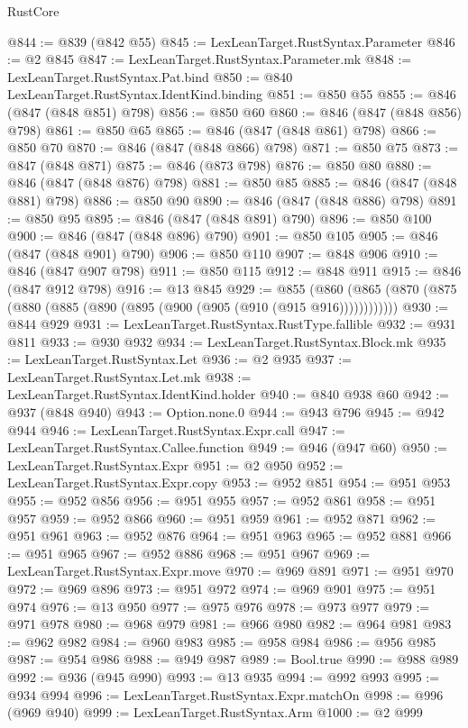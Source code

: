 \begin{lexlean}{RustCore}
\begin{coremodule}
@844 := @839 (@842 @55)
@845 := LexLeanTarget.RustSyntax.Parameter
@846 := @2 @845
@847 := LexLeanTarget.RustSyntax.Parameter.mk
@848 := LexLeanTarget.RustSyntax.Pat.bind
@850 := @840 LexLeanTarget.RustSyntax.IdentKind.binding
@851 := @850 @55
@855 := @846 (@847 (@848 @851) @798)
@856 := @850 @60
@860 := @846 (@847 (@848 @856) @798)
@861 := @850 @65
@865 := @846 (@847 (@848 @861) @798)
@866 := @850 @70
@870 := @846 (@847 (@848 @866) @798)
@871 := @850 @75
@873 := @847 (@848 @871)
@875 := @846 (@873 @798)
@876 := @850 @80
@880 := @846 (@847 (@848 @876) @798)
@881 := @850 @85
@885 := @846 (@847 (@848 @881) @798)
@886 := @850 @90
@890 := @846 (@847 (@848 @886) @798)
@891 := @850 @95
@895 := @846 (@847 (@848 @891) @790)
@896 := @850 @100
@900 := @846 (@847 (@848 @896) @790)
@901 := @850 @105
@905 := @846 (@847 (@848 @901) @790)
@906 := @850 @110
@907 := @848 @906
@910 := @846 (@847 @907 @798)
@911 := @850 @115
@912 := @848 @911
@915 := @846 (@847 @912 @798)
@916 := @13 @845
@929 := @855
    (@860 (@865 (@870 (@875 (@880 (@885 (@890 (@895 (@900 (@905 (@910 (@915 @916))))))))))))
@930 := @844 @929
@931 := LexLeanTarget.RustSyntax.RustType.fallible
@932 := @931 @811
@933 := @930 @932
@934 := LexLeanTarget.RustSyntax.Block.mk
@935 := LexLeanTarget.RustSyntax.Let
@936 := @2 @935
@937 := LexLeanTarget.RustSyntax.Let.mk
@938 := LexLeanTarget.RustSyntax.IdentKind.holder
@940 := @840 @938 @60
@942 := @937 (@848 @940)
@943 := Option.none.{0}
@944 := @943 @796
@945 := @942 @944
@946 := LexLeanTarget.RustSyntax.Expr.call
@947 := LexLeanTarget.RustSyntax.Callee.function
@949 := @946 (@947 @60)
@950 := LexLeanTarget.RustSyntax.Expr
@951 := @2 @950
@952 := LexLeanTarget.RustSyntax.Expr.copy
@953 := @952 @851
@954 := @951 @953
@955 := @952 @856
@956 := @951 @955
@957 := @952 @861
@958 := @951 @957
@959 := @952 @866
@960 := @951 @959
@961 := @952 @871
@962 := @951 @961
@963 := @952 @876
@964 := @951 @963
@965 := @952 @881
@966 := @951 @965
@967 := @952 @886
@968 := @951 @967
@969 := LexLeanTarget.RustSyntax.Expr.move
@970 := @969 @891
@971 := @951 @970
@972 := @969 @896
@973 := @951 @972
@974 := @969 @901
@975 := @951 @974
@976 := @13 @950
@977 := @975 @976
@978 := @973 @977
@979 := @971 @978
@980 := @968 @979
@981 := @966 @980
@982 := @964 @981
@983 := @962 @982
@984 := @960 @983
@985 := @958 @984
@986 := @956 @985
@987 := @954 @986
@988 := @949 @987
@989 := Bool.true
@990 := @988 @989
@992 := @936 (@945 @990)
@993 := @13 @935
@994 := @992 @993
@995 := @934 @994
@996 := LexLeanTarget.RustSyntax.Expr.matchOn
@998 := @996 (@969 @940)
@999 := LexLeanTarget.RustSyntax.Arm
@1000 := @2 @999

\end{coremodule}
\end{lexlean}
